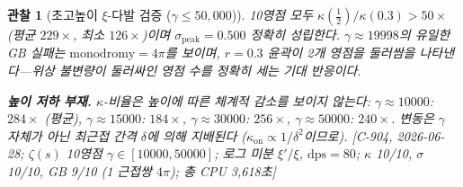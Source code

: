 \documentclass[11pt, a4paper]{article}
\theoremstyle{definition}
\theoremstyle{plain}
\newtheorem{observation}[theorem]{관찰}
\begin{document}
\begin{observation}[초고높이 $\xi$-다발 검증 ($\gamma \leq 50{,}000$)]
\smallskip\noindent
10영점 모두 $\kappa(\tfrac{1}{2})/\kappa(0.3) > 50\times$
(평균 $229\times$, 최소 $126\times$)이며 $\sigma_{\mathrm{peak}} = 0.500$
정확히 성립한다.  $\gamma \approx 19998$의 유일한 GB 실패는
$\mathrm{monodromy} = 4\pi$를 보이며, $r=0.3$ 윤곽이
\emph{2개} 영점을 둘러쌈을 나타낸다---위상 불변량이
둘러싸인 영점 수를 정확히 세는 기대 반응이다.

\smallskip\noindent
\textbf{높이 저하 부재.}\;
$\kappa$-비율은 높이에 따른 체계적 감소를 보이지 않는다:
$\gamma\approx 10000$: $284\times$ (평균),
$\gamma\approx 15000$: $184\times$,
$\gamma\approx 30000$: $256\times$,
$\gamma\approx 50000$: $240\times$.
변동은 $\gamma$ 자체가 아닌 최근접 간격 $\delta$에 의해
지배된다 ($\kappa_{\mathrm{on}} \propto 1/\delta^2$이므로).
[C-904, 2026-06-28;
$\zeta(s)$ 10영점 $\gamma{\in}[10000,50000]$;
로그 미분 $\xi'/\xi$, $\mathrm{dps}{=}80$;
$\kappa$ 10/10, $\sigma$ 10/10, GB 9/10 (1 근접쌍 $4\pi$);
총 CPU 3{,}618초]
\end{observation}
\end{document}
